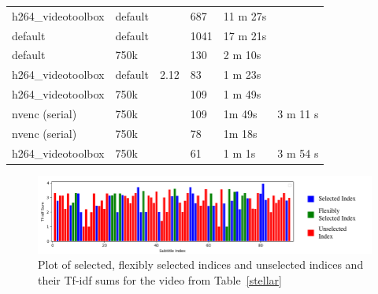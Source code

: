 \begin{table}[!htp]
{\begin{tabular}{|l|l|l|l|l|l|}
h264\_videotoolbox & default &\multirow{7}{*}{2.12} & 687                        & 11 m 27s                       &                                                    \\ \cline{1-2}\cline{4-5}
default            & default &  & 1041                       & 17 m 21s                       &                                                    \\ \cline{1-2}\cline{4-5}
default            & 750k    & & 130                        & 2 m 10s                        &                                                    \\ \cline{1-2}\cline{4-5}
h264\_videotoolbox & default & & 83                         & 1 m 23s                        &                                                    \\ \cline{1-2}\cline{4-5}
h264\_videotoolbox & 750k    & & 109                        & 1 m 49s                        &                                                    \\ \cline{1-2}\cline{4-5}
nvenc (serial)     & 750k     & & 109                        & 1m 49s                         & \multirow{-6}{*}{3 m 11 s}                         \\ \cline{1-2}\cline{4-6}
nvenc (serial)     & 750k     & & \cellcolor[HTML]{67FD9A}78 & \cellcolor[HTML]{67FD9A}1m 18s & \cellcolor[HTML]{67FD9A}                           \\ \cline{1-2}\cline{4-5}
h264\_videotoolbox & 750k     & & \cellcolor[HTML]{67FD9A}61 & \cellcolor[HTML]{67FD9A}1 m 1s & \multirow{-2}{*}{\cellcolor[HTML]{67FD9A}3 m 54 s} \\ \hline
\end{tabular}}
\end{table}

\begin{figure}[!htpb]
\centering\includegraphics[width=\textwidth]{Legend}
\caption{Plot of selected, flexibly selected indices and unselected indices and their Tf-idf sums for the video from Table~\ref{stellar}}
\label{fig:stellar}
\end{figure}

